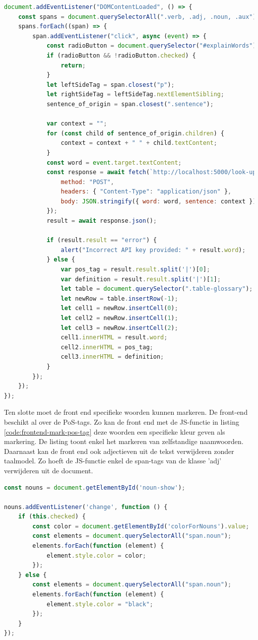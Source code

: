 \begin{lstlisting}[language=javascript, caption={Een woord aan de woordenlijst toevoegen in het scholierencomponent.}, label={code:frontend-add-word-to-glossary}]
document.addEventListener("DOMContentLoaded", () => {
	const spans = document.querySelectorAll(".verb, .adj, .noun, .aux");
	spans.forEach((span) => {
		span.addEventListener("click", async (event) => {
			const radioButton = document.querySelector("#explainWords");
			if (radioButton && !radioButton.checked) {
				return;
			}
			let leftSideTag = span.closest("p");
			let rightSideTag = leftSideTag.nextElementSibling;
			sentence_of_origin = span.closest(".sentence");
			
			var context = "";
			for (const child of sentence_of_origin.children) {
				context = context + " " + child.textContent;
			}
			const word = event.target.textContent;
			const response = await fetch(`http://localhost:5000/look-up-word`, {
				method: "POST",
				headers: { "Content-Type": "application/json" },
				body: JSON.stringify({ word: word, sentence: context }),
			});
			result = await response.json();
			
			if (result.result == "error") {
				alert("Incorrect API key provided: " + result.word);
			} else {
				var pos_tag = result.result.split('|')[0];
				var definition = result.result.split('|')[1];
				let table = document.querySelector(".table-glossary");
				let newRow = table.insertRow(-1);
				let cell1 = newRow.insertCell(0);
				let cell2 = newRow.insertCell(1);
				let cell3 = newRow.insertCell(2);
				cell1.innerHTML = result.word;
				cell2.innerHTML = pos_tag;
				cell3.innerHTML = definition;
			}
		});
	});
});
\end{lstlisting}


Ten slotte moet de front end specifieke woorden kunnen markeren. De front-end beschikt al over de PoS-tags. Zo kan de front end met de JS-functie in listing \ref{code:frontend-mark-pos-tag} deze woorden een specifieke kleur geven als markering. De listing toont enkel het markeren van zelfstandige naamwoorden. Daarnaast kan de front end ook adjectieven uit de tekst verwijderen zonder taalmodel. Zo hoeft de JS-functie enkel de span-tags van de klasse 'adj' verwijderen uit de document.

\begin{lstlisting}[language=javascript, caption={Zelfstandige naamwoorden in het scholierencomponent markeren.}, label={code:frontend-mark-pos-tag}]
const nouns = document.getElementById('noun-show');

nouns.addEventListener('change', function () {
	if (this.checked) {
		const color = document.getElementById('colorForNouns').value;
		const elements = document.querySelectorAll("span.noun");
		elements.forEach(function (element) {
			element.style.color = color;
		});
	} else {
		const elements = document.querySelectorAll("span.noun");
		elements.forEach(function (element) {
			element.style.color = "black";
		});
	}
});
\end{lstlisting}

